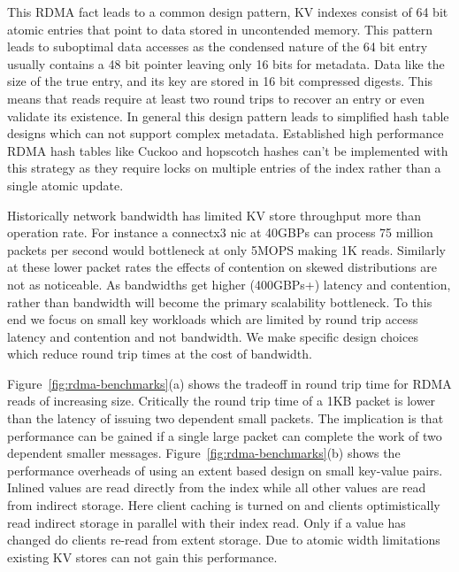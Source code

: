 This RDMA fact leads to a common design
pattern, KV indexes consist of 64 bit atomic entries that point to data stored in uncontended
memory. This pattern leads to suboptimal data accesses as the condensed nature of the 64 bit entry
usually contains a 48 bit pointer leaving only 16 bits for metadata. Data like the size of the true
entry, and its key are stored in 16 bit compressed digests. This means that reads require at least
two round trips to recover an entry or even validate its existence. In general this design pattern
leads to simplified hash table designs which can not support complex metadata. Established high
performance RDMA hash tables like Cuckoo and hopscotch hashes can’t be implemented with this
strategy as they require locks on multiple entries of the index rather than a single atomic update.

Historically network bandwidth has limited KV store throughput more than operation rate. For
instance a connectx3 nic at 40GBPs can process 75 million packets per second would bottleneck at
only 5MOPS making 1K reads. Similarly at these lower packet rates the effects of contention on
skewed distributions are not as noticeable. As bandwidths get higher (400GBPs+) latency and
contention, rather than bandwidth will become the primary scalability bottleneck. To this end we
focus on small key workloads which are limited by round trip access latency and contention and not
bandwidth. We make specific design choices which reduce round trip times at the cost of bandwidth.

Figure~\ref{fig:rdma-benchmarks}(a) shows the tradeoff in round trip time for RDMA reads of
increasing size. Critically the round trip time of a 1KB packet is lower than the latency of issuing
two dependent small packets.  The implication is that performance can be gained if a single large
packet can complete the work of two dependent smaller messages. Figure~\ref{fig:rdma-benchmarks}(b)
shows the performance overheads of using an extent based design on small key-value pairs. Inlined
values are read directly from the index while all other values are read from indirect storage. Here
client caching is turned on and clients optimistically read indirect storage in parallel with their
index read. Only if a value has changed do clients re-read from extent storage. Due to atomic width
limitations existing KV stores can not gain this performance.




